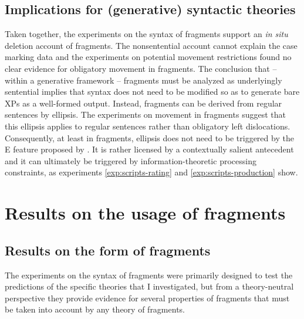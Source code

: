 \subsection{Implications for (generative) syntactic theories}
Taken together, the experiments on the syntax of fragments support an \textit{in situ} deletion account of fragments. The nonsentential account cannot explain the case marking data and the experiments on potential movement restrictions found no clear evidence for obligatory movement in fragments. The conclusion that -- within a generative framework -- fragments must be analyzed as underlyingly sentential implies that syntax does not need to be modified so as to generate bare XPs as a well-formed output. Instead, fragments can be derived from regular sentences by ellipsis. The experiments on movement in fragments suggest that this ellipsis applies to regular sentences rather than obligatory left dislocations. Consequently, at least in fragments, ellipsis does not need to be triggered by the E feature proposed by \citet{merchant2004}. It is rather licensed by a contextually salient antecedent and it can ultimately be triggered by information-theoretic processing constraints, as experiments \ref{exp:scripts-rating} and \ref{exp:scripts-production} show.

\section{Results on the usage of fragments}
\subsection{Results on the form of fragments}

The experiments on the syntax of fragments were primarily designed to test the predictions of the specific theories that I investigated, but from a theory-neutral perspective they provide evidence for several properties of fragments that must be taken into account by any theory of fragments. 

